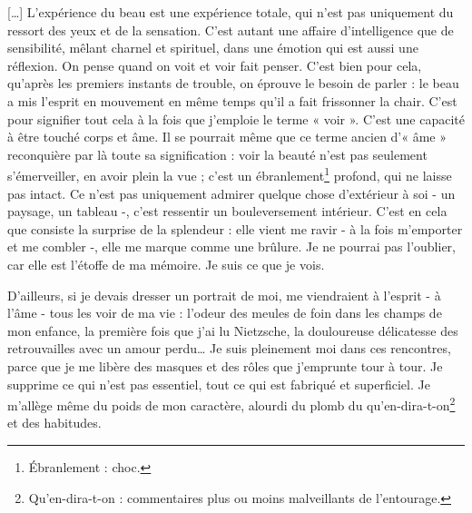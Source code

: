 	{[…] L’expérience du beau est une expérience totale, qui n’est pas uniquement du ressort des yeux et de la sensation.
C’est autant une affaire d’intelligence que de sensibilité, mêlant charnel et spirituel, dans une émotion qui est aussi une réflexion. On pense quand on voit et voir fait penser. C’est bien pour cela, qu’après les premiers instants de trouble, on éprouve le besoin de parler : le beau a mis l’esprit en mouvement en même temps qu’il a fait frissonner la chair. C’est pour signifier tout cela à la fois que j’emploie le terme « voir ». C’est une capacité à être touché corps et âme. Il se pourrait même que ce terme ancien d’« âme » reconquière par là toute sa signification : voir la beauté n’est pas seulement s’émerveiller, en avoir plein la vue ; c’est un ébranlement\footnote{Ébranlement : choc.} profond, qui ne laisse pas intact. Ce n’est pas uniquement admirer quelque chose d’extérieur à soi - un paysage, un tableau -, c’est ressentir un bouleversement intérieur. C’est en cela que consiste la surprise de la splendeur : elle vient me ravir - à la fois m’emporter et me combler -, elle me marque comme une brûlure. Je ne pourrai pas l’oublier, car elle est l’étoffe de ma mémoire. Je suis ce que je vois.

D’ailleurs, si je devais dresser un portrait de moi, me viendraient à l’esprit - à l’âme - tous les voir de ma vie : l’odeur des meules de foin dans les champs de mon enfance, la première fois que j’ai lu Nietzsche, la douloureuse délicatesse des retrouvailles avec un amour perdu… Je suis pleinement moi dans ces rencontres, parce que je me libère des masques et des rôles que j’emprunte tour à tour. Je supprime ce qui n’est pas essentiel, tout ce qui est fabriqué et superficiel. Je m’allège même du poids de mon caractère, alourdi du plomb du qu’en-dira-t-on\footnote{Qu’en-dira-t-on : commentaires plus ou moins malveillants de l’entourage.} et des habitudes.

}
